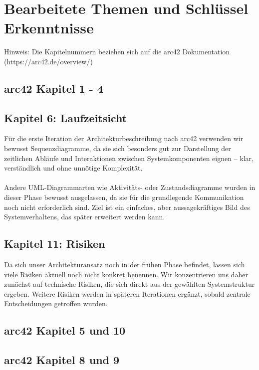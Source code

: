 \documentclass{article}
\begin{document}


\section{Bearbeitete Themen und Schlüssel Erkenntnisse}
Hinweis: Die Kapitelnummern beziehen sich auf die arc42 Dokumentation (https://arc42.de/overview/)

\subsection{arc42 Kapitel 1 - 4}


\subsection{Kapitel 6: Laufzeitsicht}
Für die erste Iteration der Architekturbeschreibung nach arc42 verwenden wir bewusst Sequenzdiagramme, da sie sich besonders gut zur Darstellung der zeitlichen Abläufe und Interaktionen zwischen Systemkomponenten eignen – klar, verständlich und ohne unnötige Komplexität.\\\\
Andere UML-Diagrammarten wie Aktivitäts- oder Zustandsdiagramme wurden in dieser Phase bewusst ausgelassen, da sie für die grundlegende Kommunikation noch nicht erforderlich sind. Ziel ist ein einfaches, aber aussagekräftiges Bild des Systemverhaltens, das später erweitert werden kann.
\subsection{Kapitel 11: Risiken}
Da sich unser Architekturansatz noch in der frühen Phase befindet, lassen sich viele Risiken aktuell noch nicht konkret benennen.
Wir konzentrieren uns daher zunächst auf technische Risiken, die sich direkt aus der gewählten Systemstruktur ergeben. Weitere Risiken werden in späteren Iterationen ergänzt, sobald zentrale Entscheidungen getroffen wurden.



\subsection{arc42 Kapitel 5 und 10}


\subsection{arc42 Kapitel 8 und 9}
\end{document}
